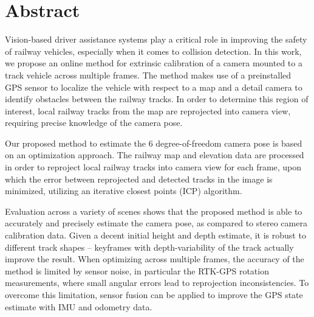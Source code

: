 \chapter*{Abstract}

Vision-based driver assistance systems play a critical role in improving the safety of railway vehicles, especially when it comes to collision detection. In this work, we propose an online method for extrinsic calibration of a camera mounted to a track vehicle across multiple frames. The method makes use of a preinstalled GPS sensor to localize the vehicle with respect to a map and a detail camera to identify obstacles between the railway tracks. In order to determine this region of interest, local railway tracks from the map are reprojected into camera view, requiring precise knowledge of the camera pose.

Our proposed method to estimate the 6 degree-of-freedom camera pose is based on an optimization approach. The railway map and elevation data are processed in order to reproject local railway tracks into camera view for each frame, upon which the error between reprojected and detected tracks in the image is minimized, utilizing an iterative closest points (ICP) algorithm.

Evaluation across a variety of scenes shows that the proposed method is able to accurately and precisely estimate the camera pose, as compared to stereo camera calibration data. Given a decent initial height and depth estimate, it is robust to different track shapes -- keyframes with depth-variability of the track actually improve the result. When optimizing across multiple frames, the accuracy of the method is limited by sensor noise, in particular the RTK-GPS rotation measurements, where small angular errors lead to reprojection inconsistencies. To overcome this limitation, sensor fusion can be applied to improve the GPS state estimate with IMU and odometry data.